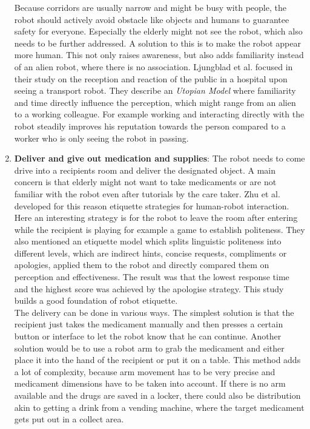 \documentclass[plainarticle,zihtitle,english,final,hyperref,utf8]{zihpub}
\begin{document}
\begin{enumerate}
    Because corridors are usually narrow and might be busy with people, the robot should actively avoid obstacle like objects and humans to guarantee safety for everyone. Especially the elderly might not see the robot, which also needs to be further addressed. A solution to this is to make the robot appear more human. This not only raises awareness, but also adds familiarity instead of an alien robot, where there is no association. Ljungblad et al. \cite{Ljungblad2012} focused in their study on the reception and reaction of the public in a hospital upon seeing a transport robot. They describe an \textit{Utopian Model} where familiarity and time directly influence the perception, which might range from an alien to a working colleague. For example working and interacting directly with the robot steadily improves his reputation towards the person compared to a worker who is only seeing the robot in passing. \\
    \item \textbf{Deliver and give out medication and supplies}: The robot needs to come drive into a recipients room and deliver the designated object. A main concern is that elderly might not want to take medicaments or are not familiar with the robot even after tutorials by the care taker. Zhu et al. \cite{Zhu2012} developed for this reason etiquette strategies for human-robot interaction. Here an interesting strategy is for the robot to leave the room after entering while the recipient is playing for example a game to establish politeness. They also mentioned an etiquette model which splits linguistic politeness into different levels, which are indirect hints, concise requests, compliments or apologies, applied them to the robot and directly compared them on perception and effectiveness. The result was that the lowest response time and the highest score was achieved by the apologise strategy. This study builds a good foundation of robot etiquette.\\
    \newline
    The delivery can be done in various ways. The simplest solution is that the recipient just takes the medicament manually and then presses a certain button or interface to let the robot know that he can continue. Another solution would be to use a robot arm to grab the medicament and either place it into the hand of the recipient or put it on a table. This method adds a lot of complexity, because arm movement has to be very precise and medicament dimensions have to be taken into account. If there is no arm available and the drugs are saved in a locker, there could also be distribution akin to getting a drink from a vending machine, where the target medicament gets put out in a collect area.\\

\end{enumerate}
\end{document}
